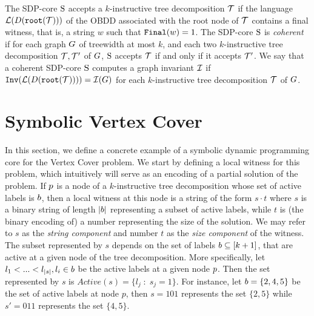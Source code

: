 The SDP-core $\mathrm{S}$ accepts a $k$-instructive tree decomposition  $\mathcal{T}$ if the language $\mathcal{L}(D(\texttt{root}(\mathcal{T})))$ of the OBDD associated with the root node of $\mathcal{T}$ contains a final witness, 
that is, a string $w$ such that $\texttt{Final}(w)=1$. The SDP-core $\mathrm{S}$ is {\em coherent} if for 
each graph $G$ of treewidth at most $k$, and each two $k$-instructive tree 
decomposition $\mathcal{T},\mathcal{T}'$ of $G$, $\mathrm{S}$ accepts $\mathcal{T}$ if and only if 
it accepts $\mathcal{T}'$. We say that a coherent SDP-core $\mathrm{S}$ computes a graph invariant 
$\mathcal{I}$ if $\texttt{Inv}(\mathcal{L}(D(\texttt{root}(\mathcal{T})))) = \mathcal{I}(G)$ for each $k$-instructive tree decomposition $\mathcal{T}$ of $G$. 


\section{Symbolic Vertex Cover}\label{Symbolic Vertex Cover (sketch)}

In this section, we define a concrete example of a symbolic dynamic programming core for the {\sc Vertex Cover} problem. We start by defining a local witness for this problem, which intuitively will serve as an encoding of a partial solution of the problem. 
If $p$ is a node of a $k$-instructive tree decomposition whose set of active labels is $b$, then a local witness at this node is a string of the form $s\cdot t$ where $s$ is a binary string of length $|b|$ representing a subset of active labels, while $t$ is (the binary encoding of) a number representing the size of the solution. We may refer to $s$ as the \textit{string component} and number $t$ as the \textit{size component} of the witness. The subset represented by $s$ depends on the set of labels $b \subseteq [k+1]$, that are active at a given node of the tree decomposition. More specifically, let $l_1 < ... < l_{|s|}, l_i \in b$ be the active labels at a given node $p$. Then the set represented by $s$ is $Active(s) = \{l_j \;:\; s_j=1\}$. For instance, let
$b = \{2,4,5\}$ be the set of active labels at node $p$, then $s=101$ represents the set $\{2,5\}$ while $s'=011$ represents the set $\{4,5\}$. 

